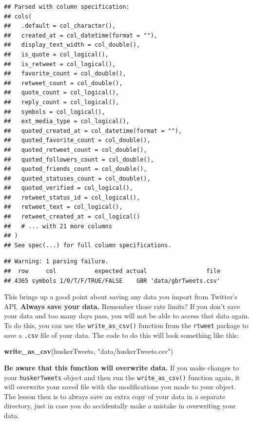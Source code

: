 \documentclass[
]{book}
\newenvironment{Shaded}{\begin{snugshade}}{\end{snugshade}}
\newcommand{\KeywordTok}[1]{\textcolor[rgb]{0.13,0.29,0.53}{\textbf{#1}}}
\newcommand{\NormalTok}[1]{#1}
\newcommand{\StringTok}[1]{\textcolor[rgb]{0.31,0.60,0.02}{#1}}
\begin{document}
\begin{verbatim}
## Parsed with column specification:
## cols(
##   .default = col_character(),
##   created_at = col_datetime(format = ""),
##   display_text_width = col_double(),
##   is_quote = col_logical(),
##   is_retweet = col_logical(),
##   favorite_count = col_double(),
##   retweet_count = col_double(),
##   quote_count = col_logical(),
##   reply_count = col_logical(),
##   symbols = col_logical(),
##   ext_media_type = col_logical(),
##   quoted_created_at = col_datetime(format = ""),
##   quoted_favorite_count = col_double(),
##   quoted_retweet_count = col_double(),
##   quoted_followers_count = col_double(),
##   quoted_friends_count = col_double(),
##   quoted_statuses_count = col_double(),
##   quoted_verified = col_logical(),
##   retweet_status_id = col_logical(),
##   retweet_text = col_logical(),
##   retweet_created_at = col_logical()
##   # ... with 21 more columns
## )
## See spec(...) for full column specifications.
\end{verbatim}

\begin{verbatim}
## Warning: 1 parsing failure.
##  row     col           expected actual                 file
## 4365 symbols 1/0/T/F/TRUE/FALSE    GBR 'data/gbrTweets.csv'
\end{verbatim}

This brings up a good point about saving any data you import from Twitter's API. \textbf{Always save your data.} Remember those rate limits? If you don't save your data and too many days pass, you will not be able to access that data again. To do this, you can use the \texttt{write\_as\_csv()} function from the \texttt{rtweet} package to save a \texttt{.csv} file of your data. The code to do this will look something like this:

\begin{Shaded}
\begin{Highlighting}[]
\KeywordTok{write_as_csv}\NormalTok{(huskerTweets, }\StringTok{"data/huskerTweets.csv"}\NormalTok{)}
\end{Highlighting}
\end{Shaded}

\textbf{Be aware that this function will overwrite data.} If you make changes to your \texttt{huskerTweets} object and then run the \texttt{write\_as\_csv()} function again, it will overwrite your saved file with the modifications you made to your object. The lesson then is to always save an extra copy of your data in a separate directory, just in case you do accidentally make a mistake in overwriting your data.
\end{document}
